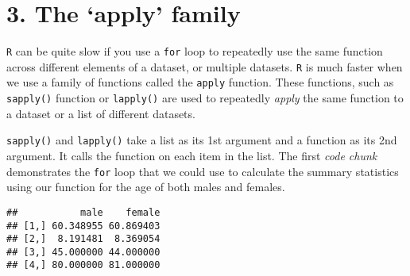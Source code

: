 \documentclass[
]{article}
\newenvironment{Shaded}{\begin{snugshade}}{\end{snugshade}}
\newcommand{\CommentTok}[1]{\textcolor[rgb]{0.56,0.35,0.01}{\textit{#1}}}
\newcommand{\ControlFlowTok}[1]{\textcolor[rgb]{0.13,0.29,0.53}{\textbf{#1}}}
\newcommand{\DataTypeTok}[1]{\textcolor[rgb]{0.13,0.29,0.53}{#1}}
\newcommand{\DecValTok}[1]{\textcolor[rgb]{0.00,0.00,0.81}{#1}}
\newcommand{\KeywordTok}[1]{\textcolor[rgb]{0.13,0.29,0.53}{\textbf{#1}}}
\newcommand{\NormalTok}[1]{#1}
\newcommand{\OperatorTok}[1]{\textcolor[rgb]{0.81,0.36,0.00}{\textbf{#1}}}
\newcommand{\StringTok}[1]{\textcolor[rgb]{0.31,0.60,0.02}{#1}}
\begin{document}
\hypertarget{the-apply-family}{%
\section{3. The `apply' family}\label{the-apply-family}}

\texttt{R} can be quite slow if you use a \texttt{for} loop to
repeatedly use the same function across different elements of a dataset,
or multiple datasets. \texttt{R} is much faster when we use a family of
functions called the \texttt{apply} function. These functions, such as
\texttt{sapply()} function or \texttt{lapply()} are used to repeatedly
\emph{apply} the same function to a dataset or a list of different
datasets.

\texttt{sapply()} and \texttt{lapply()} take a list as its 1st argument
and a function as its 2nd argument. It calls the function on each item
in the list. The first \emph{code chunk} demonstrates the \texttt{for}
loop that we could use to calculate the summary statistics using our
function for the age of both males and females.

\begin{Shaded}
\end{Shaded}

\begin{verbatim}
##           male    female
## [1,] 60.348955 60.869403
## [2,]  8.191481  8.369054
## [3,] 45.000000 44.000000
## [4,] 80.000000 81.000000
\end{verbatim}
\end{document}

